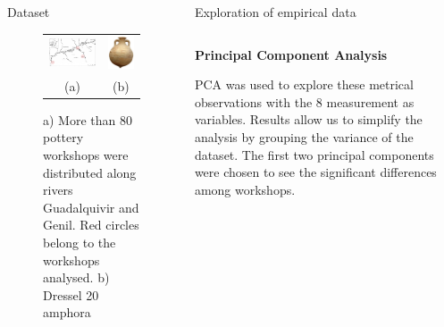 \documentclass[final]{beamer}
\newlength{\onecolwid}
\newlength{\twocolwid}
\begin{document}
\begin{frame}[t]
\begin{columns}[t]
\begin{column}{\onecolwid}
\begin{block}{Dataset}
\begin{figure}
\begin{tabular}{cc}


\includegraphics[width=0.7\linewidth]{images/fig1.png} &
\includegraphics[width=0.2\linewidth]{images/amphorae.png} \\
(a) & (b)
\end{tabular}

\caption{a) More than 80 pottery workshops were distributed along rivers Guadalquivir and Genil. Red circles belong to the workshops analysed. b) Dressel 20 amphora}
\label{fig:betica}
\end{figure}


 \end{block}
\end{column} %

\begin{column}{\twocolwid}


\begin{block}{Exploration of empirical data}
\begin{columns}[t,totalwidth=\twocolwid]



\begin{column}{\onecolwid} %


{\textbf{Principal Component Analysis}} 
\justify

PCA was used to explore these metrical observations with the 8 measurement as variables. Results allow us to simplify the analysis by grouping the variance of the dataset. The first two principal components were chosen to see the significant differences among workshops. 


\end{column}
\end{columns}
\end{block}
\end{column}
\end{columns}
\end{frame}
\end{document}
